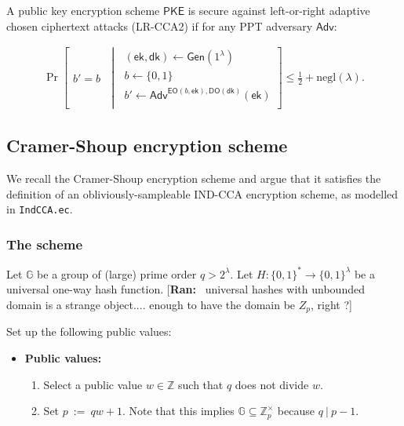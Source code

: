 \documentclass[11pt,letterpaper]{article}
\newcommand{\authnote}[2]{[{\color{red}\textbf{#1:}}~{\color{blue} #2}]}
\newcommand{\authnote}[2]{}
\newcommand{\ran}[1]{\authnote{Ran}{#1}}
\theoremstyle{plain} %
\theoremstyle{definition} %
\theoremstyle{remark} %
\newcommand{\code}[1]{\texttt{#1}} %
\newcommand{\eqdef}{\ {:=} \ }
\newcommand{\SecParam}{\lambda}
\newcommand{\PKE}{\mathsf{PKE}}
\newcommand{\Gen}{\mathsf{Gen}}
\newcommand{\EncKey}{\mathsf{ek}}
\newcommand{\DecKey}{\mathsf{dk}}
\newcommand{\GuessBit}{b'}
\newcommand{\ChallengerBit}{b}
\newcommand{\EncOracle}{\mathsf{EO}}
\newcommand{\DecOracle}{\mathsf{DO}}
\newcommand{\Adversary}{{\mathsf{Adv}}} %
\newcommand{\pST}{\; \middle| \;}
\newcommand{\negl}{\mathrm{negl}}
\newcommand{\Bits}{\{0,1\}}
\newcommand{\Integers}{\mathbb{Z}}
\newcommand{\Group}{\mathbb{G}}
\newcommand{\GrpOrd}{q}
\newcommand{\Hash}{H}
\begin{document}
A public key encryption scheme $\PKE$ is secure against left-or-right adaptive chosen ciphertext attacks (LR-CCA2) if for any PPT adversary $\Adversary$:

\begin{align*}
	\Pr \left[
	\begin{array}{c}
		\GuessBit = \ChallengerBit
	\end{array}
	\pST
	\begin{array}{r}
		(\EncKey, \DecKey) \gets \Gen(1^{\SecParam})\\
		\ChallengerBit \gets \Bits\\
		\GuessBit \gets \Adversary^{\EncOracle(\ChallengerBit,\EncKey), \DecOracle(\DecKey)}(\EncKey)\\
	\end{array}
	\right] \leq \frac{1}{2} + \negl(\SecParam).
\end{align*}

\subsection{Cramer-Shoup encryption scheme}
\label{sec:cramer-shoup}
We recall the Cramer-Shoup encryption scheme \cite{CramerS98} and argue that it satisfies the definition of an obliviously-sampleable IND-CCA encryption scheme, as modelled in \code{IndCCA.ec}.

\subsubsection{The scheme}
\label{sec:cramer-shoup-scheme}

Let $\Group$ be a group of (large) prime order $\GrpOrd > 2^{\SecParam}$. Let $\Hash \colon \Bits^{*} \to \Bits^{\SecParam}$ be a universal one-way hash function. \ran{universal  hashes  with unbounded domain  is a strange object.... enough to have the domain be $Z_p$, right ?}


\newcommand{\GrpEltG}{g}
\newcommand{\MultGrpOrd}{p}
\newcommand{\MultGrp}{\Integers^{\times}_{\MultGrpOrd}}
\newcommand{\OrdW}{w}
\newcommand{\RandStr}{\mu}
\newcommand{\OblivEltGen}{\mathsf{OblivEltGen}}
\newcommand{\Inv}[1]{{#1}^{-1}}
\newcommand{\OblivEltInv}{\Inv{\mathsf{OblivEltGen}}}
Set up the following public values:
\begin{itemize}
\item[] \textbf{Public values:}
\begin{enumerate}[nolistsep]
    \item Select a public value $\OrdW \in \Integers$ such that $\GrpOrd$ does not divide $\OrdW$.
    \item Set $\MultGrpOrd \eqdef \GrpOrd \OrdW + 1$. Note that this implies $\Group \subseteq \MultGrp$ because $\GrpOrd \:|\: \MultGrpOrd - 1$.
\end{enumerate}
\end{itemize}
\end{document}
